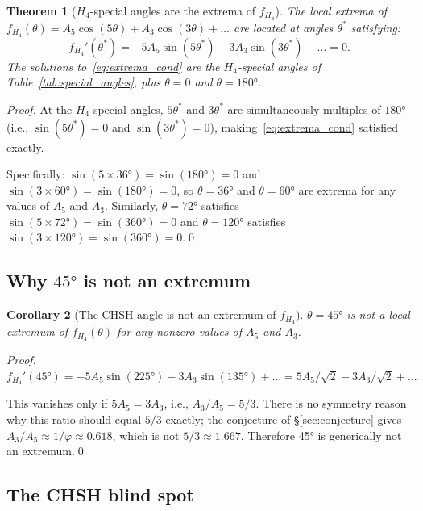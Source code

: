 \documentclass[11pt,letterpaper]{article}
\newtheorem{theorem}{Theorem}[section]
\newtheorem{corollary}[theorem]{Corollary}
\newcommand{\phig}{\varphi}
\begin{document}
\begin{theorem}[$H_4$-special angles are the extrema of $f_{H_4}$]
\label{thm:extrema}
The local extrema of $f_{H_4}(\theta) = A_5\cos(5\theta) +
A_3\cos(3\theta) + \ldots$ are located at angles
$\theta^*$ satisfying:
\begin{equation}
f_{H_4}'(\theta^*)
= -5A_5\sin(5\theta^*) - 3A_3\sin(3\theta^*) - \ldots = 0.
\label{eq:extrema_cond}
\end{equation}
The solutions to~\eqref{eq:extrema_cond} are the $H_4$-special
angles of Table~\ref{tab:special_angles}, plus $\theta = 0$ and
$\theta = 180°$.
\end{theorem}

\begin{proof}
At the $H_4$-special angles, $5\theta^*$ and $3\theta^*$ are
simultaneously multiples of $180°$ (i.e., $\sin(5\theta^*)=0$ and
$\sin(3\theta^*)=0$), making~\eqref{eq:extrema_cond} satisfied
exactly.

Specifically: $\sin(5\times36°) = \sin(180°) = 0$ and
$\sin(3\times60°) = \sin(180°) = 0$, so $\theta = 36°$ and
$\theta = 60°$ are extrema for any values of $A_5$ and $A_3$.
Similarly, $\theta = 72°$ satisfies $\sin(5\times72°) =
\sin(360°) = 0$ and $\theta = 120°$ satisfies $\sin(3\times120°) =
\sin(360°) = 0$.\qed
\end{proof}

\subsection{Why $45°$ is not an extremum}

\begin{corollary}[The CHSH angle is not an extremum of $f_{H_4}$]
\label{cor:45}
$\theta = 45°$ is not a local extremum of $f_{H_4}(\theta)$ for
any nonzero values of $A_5$ and $A_3$.
\end{corollary}

\begin{proof}
$f_{H_4}'(45°) = -5A_5\sin(225°) - 3A_3\sin(135°) + \ldots
= 5A_5/\sqrt{2} - 3A_3/\sqrt{2} + \ldots$

This vanishes only if $5A_5 = 3A_3$, i.e., $A_3/A_5 = 5/3$.  There
is no symmetry reason why this ratio should equal $5/3$ exactly; the
conjecture of \S\ref{sec:conjecture} gives $A_3/A_5 \approx 1/\phig
\approx 0.618$, which is not $5/3 \approx 1.667$.  Therefore 45° is
generically not an extremum.\qed
\end{proof}

\subsection{The CHSH blind spot}
\end{document}
